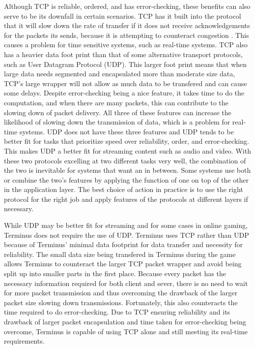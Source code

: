 \documentclass[12pt]{article}
\begin{document}
    Although TCP is reliable, ordered, and has error-checking, these benefits can also serve to be its downfall in certain scenarios. TCP has it built into the protocol that it will slow down the rate of transfer if it does not receive acknowledgements for the packets its sends, because it is attempting to counteract congestion \cite{kurose}. This causes a problem for time sensitive systems, such as real-time systems. TCP also has a heavier data foot print than that of some alternative transport protocols, such as User Datagram Protocol (UDP). This larger foot print means that when large data needs segmented and encapsulated more than moderate size data, TCP's large wrapper will not allow as much data to be transfered and can cause some delays. Despite error-checking being a nice feature, it takes time to do the computation, and when there are many packets, this can contribute to the slowing down of packet delivery. All three of these features can increase the likelihood of slowing down the transmission of data, which is a problem for real-time systems. UDP does not have these three features and UDP tends to be better fit for tasks that prioritize speed over reliability, order, and error-checking. This makes UDP a better fit for streaming content such as audio and video. With these two protocols excelling at two different tasks very well, the combination of the two is inevitable for systems that want an in between. Some systems use both or combine the two's features by applying the function of one on top of the other in the application layer. The best choice of action in practice is to use the right protocol for the right job and apply features of the protocols at different layers if necessary.
    
    While UDP may be better fit for streaming and for some cases in online gaming, Terminus does not require the use of UDP. Terminus uses TCP rather than UDP because of Terminus' minimal data footprint for data transfer and necessity for reliability. The small data size being transfered in Terminus during the game allows Terminus to counteract the larger TCP packet wrapper and avoid being split up into smaller parts in the first place. Because every packet has the necessary information required for both client and sever, there is no need to wait for more packet transmission and thus overcoming the drawback of the larger packet size slowing down transmissions. Fortunately, this also counteracts the time required to do error-checking. Due to TCP ensuring reliability and its drawback of larger packet encapsulation and time taken for error-checking being overcome, Terminus is capable of using TCP alone and still meeting its real-time requirements.
    
\end{document}
